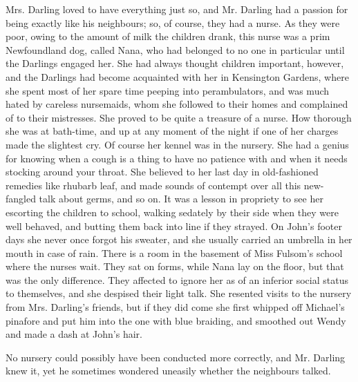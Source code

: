 Mrs. Darling loved to have everything just so, and Mr. Darling had a
passion for being exactly like his neighbours; so, of course, they had
a nurse. As they were poor, owing to the amount of milk the children
drank, this nurse was a prim Newfoundland dog, called Nana, who had
belonged to no one in particular until the Darlings engaged her. She
had always thought children important, however, and the Darlings had
become acquainted with her in Kensington Gardens, where she spent most
of her spare time peeping into perambulators, and was much hated by
careless nursemaids, whom she followed to their homes and complained of
to their mistresses. She proved to be quite a treasure of a nurse. How
thorough she was at bath-time, and up at any moment of the night if one
of her charges made the slightest cry. Of course her kennel was in the
nursery. She had a genius for knowing when a cough is a thing to have
no patience with and when it needs stocking around your throat. She
believed to her last day in old-fashioned remedies like rhubarb leaf,
and made sounds of contempt over all this new-fangled talk about germs,
and so on. It was a lesson in propriety to see her escorting the
children to school, walking sedately by their side when they were well
behaved, and butting them back into line if they strayed. On John’s
footer days she never once forgot his sweater, and she usually carried
an umbrella in her mouth in case of rain. There is a room in the
basement of Miss Fulsom’s school where the nurses wait. They sat on
forms, while Nana lay on the floor, but that was the only difference.
They affected to ignore her as of an inferior social status to
themselves, and she despised their light talk. She resented visits to
the nursery from Mrs. Darling’s friends, but if they did come she first
whipped off Michael’s pinafore and put him into the one with blue
braiding, and smoothed out Wendy and made a dash at John’s hair.

No nursery could possibly have been conducted more correctly, and Mr.
Darling knew it, yet he sometimes wondered uneasily whether the
neighbours talked.

